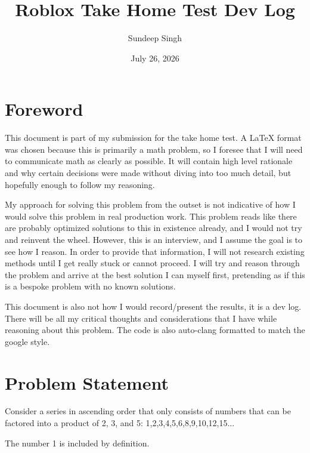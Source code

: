 \documentclass{article}
\title{Roblox Take Home Test Dev Log}
\author{Sundeep Singh}
\date{July 26, 2026}
\begin{document}
\maketitle

\newpage

\tableofcontents

\newpage

\section{Foreword}

This document is part of my submission for the take home test. A LaTeX format was chosen because this is primarily a math problem, so I foresee that I will need to communicate math as clearly as possible. It will contain high level rationale and why certain decisions were made without diving into too much detail, but hopefully enough to follow my reasoning. \newline

My approach for solving this problem from the outset is not indicative of how I would solve this problem in real production work. This problem reads like there are probably optimized solutions to this in existence already, and I would not try and reinvent the wheel. However, this is an interview, and I assume the goal is to see how I reason. In order to provide that information, I will not research existing methods until I get really stuck or cannot proceed. I will try and reason through the problem and arrive at the best solution I can myself first, pretending as if this is a bespoke problem with no known solutions. \newline

This document is also not how I would record/present the results, it is a dev log. There will be all my critical thoughts and considerations that I have while reasoning about this problem. The code is also auto-clang formatted to match the google style.

\newpage

\section{Problem Statement}

Consider a series in ascending order that only consists of numbers that can be factored into a product of 2, 3, and 5: 1,2,3,4,5,6,8,9,10,12,15... \newline

The number 1 is included by definition. \newline
\end{document}
